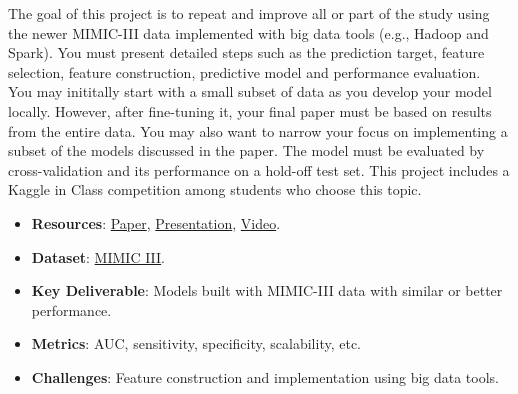 \documentclass[journal]{IEEEtran}
\begin{document}
The goal of this project is to repeat and improve all or part of the study\cite{ghassemi_unfolding_2014} using the newer MIMIC-III data\cite{saeed_multiparameter_2011} implemented with big data tools (e.g., Hadoop and Spark). You must present detailed steps such as the prediction target, feature selection, feature construction, predictive model and performance evaluation.\\
You may inititally start with a small subset of data as you develop your model locally. However, after fine-tuning it, your final paper must be based on results from the entire data. You may also want to narrow your focus on implementing a subset of the models discussed in the paper. %
The model must be evaluated by cross-validation and its performance on a hold-off test set. This project includes a Kaggle in Class competition among students who choose this topic.

\begin{itemize}
	\item \textbf{Resources}: \href{http://mghassem.mit.edu/wp-content/uploads/2013/02/ghassemi_naumann_kdd2014.pdf}{Paper},  \href{http://mghassem.mit.edu/wp-content/uploads/2013/02/Ghassemi_KDD2014_Presentation.pdf}{Presentation}, \href{http://videolectures.net/kdd2014_ghassemi_physiological_state/}{Video}.
   	\item \textbf{Dataset}: \href{https://mimic.physionet.org/gettingstarted/dbsetup/}{MIMIC III}.
    \item \textbf{Key Deliverable}: Models built with MIMIC-III data with similar or better performance.
    \item \textbf{Metrics}: AUC, sensitivity, specificity, scalability, etc.
    \item \textbf{Challenges}: Feature construction and implementation using big data tools.
\end{itemize}

\end{document}

